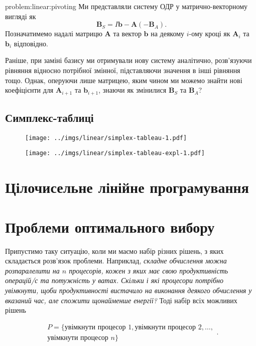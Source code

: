 \documentclass[\main/book.tex]{subfiles}
\begin{document}
\begin{problem}{problem:linear:pivoting}
 Ми представляли систему ОДР у матрично-векторному вигляді як
 \[
  \mathbf{B}_S = I \mathbf{b} - \mathbf{A}(-\mathbf{B}_A)
  \text{.}
 \]
 Позначатимемо надалі матрицю $\mathbf{A}$ та вектор $\mathbf{b}$ на деякому $i$-ому кроці як $\mathbf{A}_i$ та $\mathbf{b}_i$ відповідно.

 Раніше, при заміні базису ми отримували нову систему аналітично, розв'язуючи рівняння відносно потрібної змінної, підставляючи значення в інші рівняння тощо. Однак, оперуючи лише матрицею, яким чином ми можемо знайти нові коефіцієнти для $\mathbf{A}_{i+1}$ та $\mathbf{b}_{i+1}$, знаючи як змінилися $\mathbf{B}_S$ та $\mathbf{B}_A$?
\end{problem}

\subsection{Симплекс-таблиці}

\begin{figure}
 \centering
 \texttt{[image: ../imgs/linear/simplex-tableau-1.pdf]}
\end{figure}

\begin{figure}
 \centering
 \texttt{[image: ../imgs/linear/simplex-tableau-expl-1.pdf]}
\end{figure}
\section{Цілочисельне лінійне програмування}
\label{section:linear:integer}

\section{Проблеми оптимального вибору}
\label{section:linear:x_in_0-1}

Припустимо таку ситуацію, коли ми маємо набір різних рішень, з яких складається розв'язок проблеми. Наприклад, \textit{складне обчислення можна розпаралелити на $n$ процесорів, кожен з яких має свою продуктивність операцій/с та потужність у ватах. Скільки і які процесори потрібно увімкнути, щоби продуктивності вистачило на виконання деякого обчислення у вказаний час, але спожити щонайменше енергії?} Тоді набір всіх можливих рішень

\[
\begin{split}
P = \{
 \text{увімкнути процесор 1},
 \text{увімкнути процесор 2},
 \ldots, \\
 \text{увімкнути процесор $n$}
\}
\end{split}
.
\]
\end{document}
